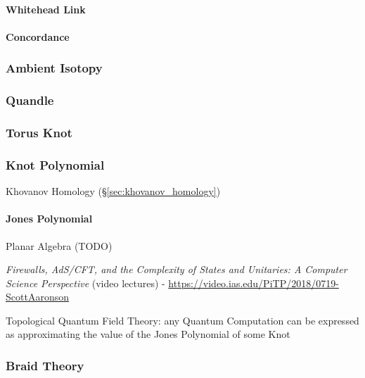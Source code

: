 \paragraph{Whitehead Link} \label{sec:whitehead_link}\hfill

\paragraph{Concordance} \label{sec:concordance}\hfill



\subsubsection{Ambient Isotopy} \label{sec:ambient_isotopy}

\subsubsection{Quandle} \label{sec:quandle}

\subsubsection{Torus Knot} \label{sec:torus_knot}

\subsubsection{Knot Polynomial} \label{sec:knot_polynomial}

\fist Khovanov Homology (\S\ref{sec:khovanov_homology})



\paragraph{Jones Polynomial} \label{sec:jones_polynomial}\hfill

Planar Algebra (TODO)

\asterism

\emph{Firewalls, AdS/CFT, and the Complexity of States and Unitaries: A Computer
  Science Perspective}
(video lectures)
-
\url{https://video.ias.edu/PiTP/2018/0719-ScottAaronson}

Topological Quantum Field Theory: any Quantum Computation can be expressed as
approximating the value of the Jones Polynomial of some Knot



\subsubsection{Braid Theory} \label{sec:braid_theory}



